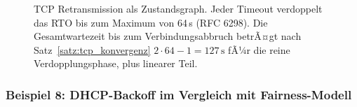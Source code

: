 ﻿\documentclass[a4paper,12pt]{article}
\theoremstyle{definition}
\begin{document}
\begin{figure}[H]
\caption{TCP Retransmission als Zustandsgraph. Jeder Timeout verdoppelt
  das RTO bis zum Maximum von 64\,s (RFC 6298). Die Gesamtwartezeit
  bis zum Verbindungsabbruch betrÃ¤gt nach Satz~\ref{satz:tcp_konvergenz}
  $2 \cdot 64 - 1 = 127\,\mathrm{s}$ fÃ¼r die reine Verdopplungsphase,
  plus linearer Teil.}
\label{fig:tikz_eb2}
\end{figure}

\subsubsection{Beispiel 8: DHCP-Backoff im Vergleich mit Fairness-Modell}
\end{document}
